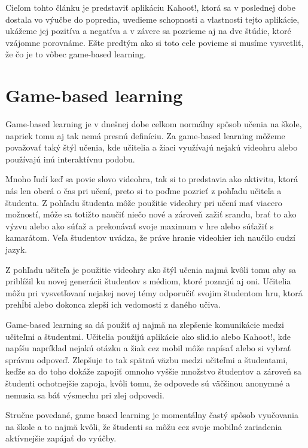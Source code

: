 \documentclass[10pt,oneside,slovak,a4paper]{article}
\begin{document}
	Cieľom tohto článku je predstaviť aplikáciu Kahoot!, ktorá sa v poslednej dobe dostala vo výučbe do popredia, uvedieme schopnosti a vlastnosti tejto aplikácie, ukážeme jej pozitíva a negatíva a v závere sa pozrieme aj na dve štúdie, ktoré vzájomne porovnáme. Ešte predtým ako si toto cele povieme si musíme vysvetliť, že čo je to vôbec game-based learning. 





\section{Game-based learning} \label{ml}

Game-based learning je v dnešnej dobe celkom normálny spôsob učenia na škole, napriek tomu aj tak nemá presnú definíciu. Za game-based learning môžeme považovať taký štýl učenia, kde učitelia a žiaci využívajú nejakú videohru alebo používajú inú interaktívnu podobu. 
	
	Mnoho ľudí keď sa povie slovo videohra, tak si to predstavia ako aktivitu, ktorá nás len oberá o čas pri učení, preto si to poďme pozrieť z pohľadu učiteľa a študenta. Z pohľadu študenta môže použitie videohry pri učení mať viacero možností, môže sa totižto naučiť niečo nové a zároveň zažiť srandu, brať to ako výzvu alebo ako súťaž a prekonávať svoje maximum v hre alebo súťažiť s kamarátom. Veľa študentov uvádza, že práve hranie videohier ich naučilo cudzí jazyk. 
	
	Z pohľadu učiteľa je použitie videohry ako štýl učenia najmä kvôli tomu aby sa priblížil ku novej generácii študentov s médiom, ktoré poznajú aj oni. Učitelia môžu pri vysvetľovaní nejakej novej témy odporučiť svojim študentom hru, ktorá prehĺbi alebo dokonca zlepší ich vedomosti z daného učiva. 
	
	Game-based learning sa dá použiť aj najmä na zlepšenie komunikácie medzi učiteľmi a študentmi. Učitelia použijú aplikácie ako slid.io alebo Kahoot!, kde napíšu napríklad nejakú otázku a žiak cez mobil môže napísať alebo si vybrať správnu odpoveď. Zlepšuje to tak spätnú väzbu medzi učiteľmi a študentami, keďže sa do toho dokáže zapojiť omnoho vyššie množstvo študentov a zároveň sa študenti ochotnejšie zapoja, kvôli tomu, že odpovede sú väčšinou anonymné a nemusia sa báť výsmechu pri zlej odpovedi. 
	
	Stručne povedané, game based learning je momentálny častý spôsob vyučovania na škole a to najmä kvôli, že študenti sa môžu cez svoje mobilné zariadenia aktívnejšie zapájať do vyúčby.
\end{document}
